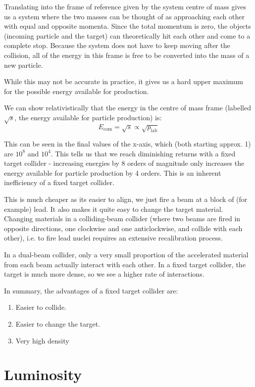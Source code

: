 Translating into the frame of reference given by the system centre of mass gives us a system where the two masses can be thought of as approaching each other with equal and opposite momenta. Since the total momentum is zero, the objects (incoming particle and the target) can theoretically hit each other and come to a complete stop. Because the system does not have to keep moving after the collision, all of the energy in this frame is free to be converted into the mass of a new particle.

While this may not be accurate in practice, it gives us a hard upper maximum for the possible energy available for production.

We can show relativistically that the energy in the centre of mass frame (labelled $\sqrt{s}$, the energy available for particle production) is:
\[
    E_\text{com} = \sqrt{s} \propto \sqrt{p_\text{lab}}
\]

This can be seen in the final values of the x-axis, which (both starting approx. 1) are $10^8$ and $10^4$. This tells us that we reach diminishing returns with a fixed target collider - increasing energies by 8 orders of magnitude only increases the energy available for particle production by 4 orders. This is an inherent inefficiency of a fixed target collider.

This is much cheaper as its easier to align, we just fire a beam at a block of (for example) lead. It also makes it quite easy to change the target material. Changing materials in a colliding-beam collider (where two beams are fired in opposite directions, one clockwise and one anticlockwise, and collide with each other), i.e. to fire lead nuclei requires an extensive recalibration process.

In a dual-beam collider, only a very small proportion of the accelerated material from each beam actually interact with each other. In a fixed target collider, the target is much more dense, so we see a higher rate of interactions.

In summary, the advantages of a fixed target collider are:
\begin{enumerate}
    \item Easier to collide.
    \item Easier to change the target.
    \item Very high density
\end{enumerate}

\section{Luminosity}
